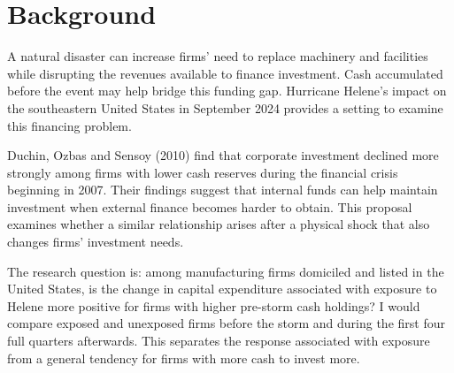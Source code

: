 \section*{Background}

A natural disaster can increase firms' need to replace machinery and facilities while disrupting the revenues available to finance investment. Cash accumulated before the event may help bridge this funding gap. Hurricane Helene's impact on the southeastern United States in September 2024 provides a setting to examine this financing problem.

Duchin, Ozbas and Sensoy (2010) find that corporate investment declined more strongly among firms with lower cash reserves during the financial crisis beginning in 2007. Their findings suggest that internal funds can help maintain investment when external finance becomes harder to obtain. This proposal examines whether a similar relationship arises after a physical shock that also changes firms' investment needs.

The research question is: among manufacturing firms domiciled and listed in the United States, is the change in capital expenditure associated with exposure to Helene more positive for firms with higher pre-storm cash holdings? I would compare exposed and unexposed firms before the storm and during the first four full quarters afterwards. This separates the response associated with exposure from a general tendency for firms with more cash to invest more.
